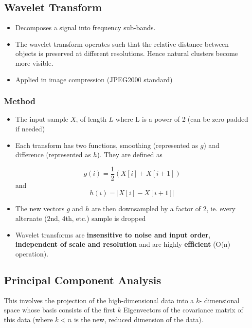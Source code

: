 \documentclass{article}
\theoremstyle{plain}
\theoremstyle{definition}
\begin{document}
\subsection{Wavelet Transform}
\begin{itemize}
    \item Decomposes a signal into frequency sub-bands. 
    
    \item The wavelet transform operates such that the relative distance between objects is preserved at different resolutions. Hence natural clusters become more visible. 
    
    \item Applied in image compression (JPEG2000 standard)
\end{itemize}

\subsubsection{Method}
\begin{itemize}
    \item The input sample $X$, of length $L$ where L is a power of 2 (can be zero padded if needed)
    
    \item Each transform has two functions, smoothing (represented as $g$) and difference (represented as $h$). They are defined as
    
    \begin{equation}
        g(i) = \frac{1}{2} (X[i] + X[i+1]) 
    \end{equation}
    and
    \begin{equation}
        h(i) = \left | X[i] - X[i+1] \right |
    \end{equation}
    
    \item The new vectors $g$ and $h$ are then downsampled by a factor of 2, ie. every alternate (2nd, 4th, etc.) sample is dropped
    
    \item Wavelet transforms are \textbf{insensitive to noise and input order}, \textbf{independent of scale and resolution} and are highly \textbf{efficient} (O(n) operation). 
\end{itemize}

\subsection{Principal Component Analysis}
This involves the projection of the high-dimensional data into a $k$- dimensional space whose basis consists of the first $k$ Eigenvectors of the covariance matrix of this data (where $k < n$ is the new, reduced dimension of the data). 
\end{document}
